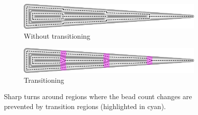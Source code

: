 \begin{figure}
\centering
\setlength{\figwidth}{\columnwidth}
\begin{subfigure}{0.9\figwidth}\centering
\includegraphics[width=\columnwidth]{sources-method-wedge-no-transitioning.png}
\caption{Without transitioning}
\end{subfigure}
\begin{subfigure}{0.9\figwidth}\centering
\includegraphics[width=\columnwidth]{sources-method-wedge-transitioning.png}
\caption{Transitioning}
\end{subfigure}
\caption{
Sharp turns around regions where the bead count changes are prevented by transition regions (highlighted in cyan).
}
\label{transitions}
\end{figure}















